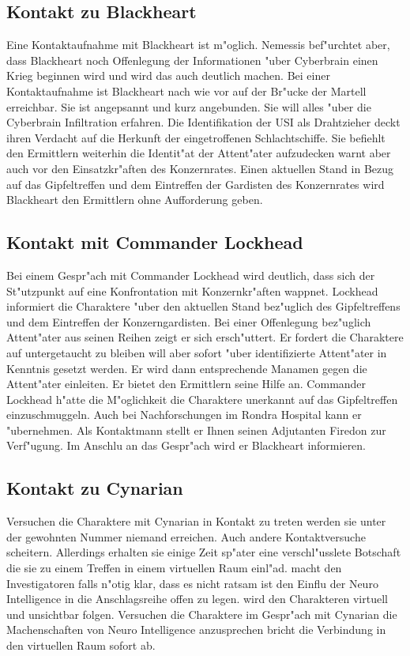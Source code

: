\subsection{Kontakt zu Blackheart} 
Eine Kontaktaufnahme mit Blackheart ist m"oglich. Nemessis bef"urchtet aber, dass Blackheart noch Offenlegung der Informationen "uber Cyberbrain einen Krieg beginnen wird und wird das auch deutlich machen. Bei einer Kontaktaufnahme ist Blackheart nach wie vor auf der Br"ucke der Martell erreichbar. Sie ist angepsannt und kurz angebunden. Sie will alles "uber die Cyberbrain Infiltration erfahren. Die Identifikation der USI als Drahtzieher deckt ihren Verdacht auf die Herkunft der eingetroffenen Schlachtschiffe. Sie befiehlt den Ermittlern weiterhin die Identit"at der Attent"ater aufzudecken warnt aber auch vor den Einsatzkr"aften des Konzernrates. Einen aktuellen Stand in Bezug auf das Gipfeltreffen und dem Eintreffen der Gardisten des Konzernrates wird Blackheart den Ermittlern ohne Aufforderung geben.

\subsection{Kontakt mit Commander Lockhead} 
Bei einem Gespr"ach mit Commander Lockhead wird deutlich, dass sich der St"utzpunkt auf eine Konfrontation mit Konzernkr"aften wappnet. Lockhead informiert die Charaktere "uber den aktuellen Stand bez"uglich des Gipfeltreffens und dem Eintreffen der Konzerngardisten. Bei einer Offenlegung bez"uglich Attent"ater aus seinen Reihen zeigt er sich ersch"uttert. Er fordert die Charaktere auf untergetaucht zu bleiben will aber sofort "uber identifizierte Attent"ater in Kenntnis gesetzt werden. Er wird dann entsprechende Ma\3namen gegen die Attent"ater einleiten. Er bietet den Ermittlern seine Hilfe an. Commander Lockhead h"atte die M"oglichkeit die Charaktere unerkannt auf das Gipfeltreffen einzuschmuggeln. Auch bei Nachforschungen im Rondra Hospital kann er "ubernehmen. Als Kontaktmann stellt er Ihnen seinen Adjutanten Firedon zur Verf"ugung. Im Anschlu\3 an das Gespr"ach wird er Blackheart informieren.

\subsection{Kontakt zu Cynarian} 
Versuchen die Charaktere mit Cynarian in Kontakt zu treten werden sie unter der gewohnten Nummer niemand erreichen. Auch andere Kontaktversuche scheitern. Allerdings erhalten sie einige Zeit sp"ater eine verschl"usslete Botschaft die sie zu einem Treffen in einem virtuellen Raum einl"ad. \xl{} macht den Investigatoren falls n"otig klar, dass es nicht ratsam ist den Einflu\3 der Neuro Intelligence in die Anschlagsreihe offen zu legen. \xl{} wird den Charakteren virtuell und unsichtbar folgen. Versuchen die Charaktere im Gespr"ach mit Cynarian die Machenschaften von Neuro Intelligence anzusprechen bricht die Verbindung in den virtuellen Raum sofort ab. 

